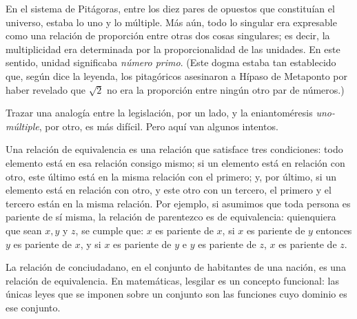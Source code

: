 \documentclass[a4paper, 12pt]{article}
\begin{document}
En el sistema de Pitágoras, entre los diez pares de opuestos que constituían el
universo, estaba lo uno y lo múltiple. Más aún, todo lo singular era expresable
como una relación de proporción entre otras dos cosas singulares; es decir, la
multiplicidad era determinada por la proporcionalidad de las unidades. En este
sentido, unidad significaba \textit{número primo}. (Este dogma estaba tan
establecido que, según dice la leyenda, los pitagóricos asesinaron a Hípaso de
Metaponto por haber revelado que $\sqrt{2}$ no era la proporción
entre ningún otro par de números.)

Trazar una analogía entre la legislación, por un lado, y la eniantoméresis
\textit{uno-múltiple}, por otro, es más difícil. Pero aquí van algunos
intentos.

Una relación de equivalencia es una relación que satisface tres condiciones:
todo elemento está en esa relación consigo mismo; si un elemento está en
relación con otro, este último está en la misma relación con el primero; y, por
último, si un elemento está en relación con otro, y este otro con un tercero,
el primero y el tercero están en la misma relación. Por ejemplo, si asumimos
que toda persona es pariente de sí misma, la relación de parentezco es de
equivalencia: quienquiera que sean $x, y$ y $z$, se cumple que: $x$ es pariente
de $x$, si $x$ es pariente de $y$ entonces $y$ es pariente de $x$, y si $x$ es
pariente de $y$ e $y$ es pariente de $z$, $x$ es pariente de $z$. 

La relación de conciudadano, en el conjunto de habitantes de una nación, es una
relación de equivalencia. En matemáticas, lesgilar es un concepto funcional:
las únicas leyes que se imponen sobre un conjunto son las funciones cuyo
dominio es ese conjunto.
\end{document}
